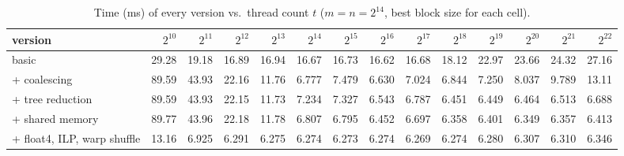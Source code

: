 \begin{table}[H]\centering\scriptsize\setlength{\tabcolsep}{3pt}
\caption{Time (ms) of every version vs.\ thread count $t$ ($m=n=2^{14}$, best block size for each cell).}\label{tab:q2trend}
\begin{tabular}{lrrrrrrrrrrrrr}\toprule
version & $2^{10}$ & $2^{11}$ & $2^{12}$ & $2^{13}$ & $2^{14}$ & $2^{15}$ & $2^{16}$ & $2^{17}$ & $2^{18}$ & $2^{19}$ & $2^{20}$ & $2^{21}$ & $2^{22}$ \\\midrule
basic & 29.28 & 19.18 & 16.89 & 16.94 & 16.67 & 16.73 & 16.62 & 16.68 & 18.12 & 22.97 & 23.66 & 24.32 & 27.16 \\
+ coalescing & 89.59 & 43.93 & 22.16 & 11.76 & 6.777 & 7.479 & 6.630 & 7.024 & 6.844 & 7.250 & 8.037 & 9.789 & 13.11 \\
+ tree reduction & 89.59 & 43.93 & 22.15 & 11.73 & 7.234 & 7.327 & 6.543 & 6.787 & 6.451 & 6.449 & 6.464 & 6.513 & 6.688 \\
+ shared memory & 89.77 & 43.96 & 22.18 & 11.78 & 6.807 & 6.795 & 6.452 & 6.697 & 6.358 & 6.401 & 6.349 & 6.357 & 6.413 \\
+ float4, ILP, warp shuffle & 13.16 & 6.925 & 6.291 & 6.275 & 6.274 & 6.273 & 6.274 & 6.269 & 6.274 & 6.280 & 6.307 & 6.310 & 6.346 \\
\bottomrule\end{tabular}\end{table}
